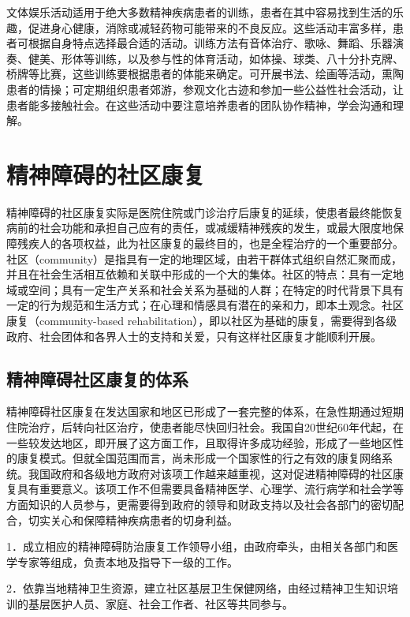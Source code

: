 文体娱乐活动适用于绝大多数精神疾病患者的训练，患者在其中容易找到生活的乐趣，促进身心健康，消除或减轻药物可能带来的不良反应。这些活动丰富多样，患者可根据自身特点选择最合适的活动。训练方法有音体治疗、歌咏、舞蹈、乐器演奏、健美、形体等训练，以及参与性的体育活动，如体操、球类、八十分扑克牌、桥牌等比赛，这些训练要根据患者的体能来确定。可开展书法、绘画等活动，熏陶患者的情操；可定期组织患者郊游，参观文化古迹和参加一些公益性社会活动，让患者能多接触社会。在这些活动中要注意培养患者的团队协作精神，学会沟通和理解。

\section{精神障碍的社区康复}

精神障碍的社区康复实际是医院住院或门诊治疗后康复的延续，使患者最终能恢复病前的社会功能和承担自己应有的责任，或减缓精神残疾的发生，或最大限度地保障残疾人的各项权益，此为社区康复的最终目的，也是全程治疗的一个重要部分。社区（community）是指具有一定的地理区域，由若干群体式组织自然汇聚而成，并且在社会生活相互依赖和关联中形成的一个大的集体。社区的特点：具有一定地域或空间；具有一定生产关系和社会关系为基础的人群；在特定的时代背景下具有一定的行为规范和生活方式；在心理和情感具有潜在的亲和力，即本土观念。社区康复（community-based
rehabilitation），即以社区为基础的康复，需要得到各级政府、社会团体和各界人士的支持和关爱，只有这样社区康复才能顺利开展。

\subsection{精神障碍社区康复的体系}

精神障碍社区康复在发达国家和地区已形成了一套完整的体系，在急性期通过短期住院治疗，后转向社区治疗，使患者能尽快回归社会。我国自20世纪60年代起，在一些较发达地区，即开展了这方面工作，且取得许多成功经验，形成了一些地区性的康复模式。但就全国范围而言，尚未形成一个国家性的行之有效的康复网络系统。我国政府和各级地方政府对该项工作越来越重视，这对促进精神障碍的社区康复具有重要意义。该项工作不但需要具备精神医学、心理学、流行病学和社会学等方面知识的人员参与，更需要得到政府的领导和财政支持以及社会各部门的密切配合，切实关心和保障精神疾病患者的切身利益。

1．成立相应的精神障碍防治康复工作领导小组，由政府牵头，由相关各部门和医学专家等组成，负责本地及指导下一级的工作。

2．依靠当地精神卫生资源，建立社区基层卫生保健网络，由经过精神卫生知识培训的基层医护人员、家庭、社会工作者、社区等共同参与。

